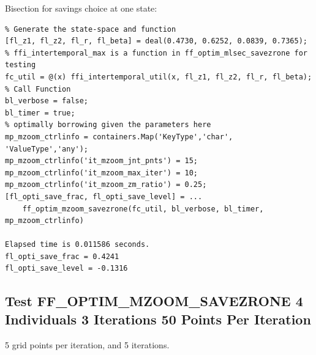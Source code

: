 \documentclass[
]{book}
\begin{document}
Bisection for savings choice at one state:

\begin{verbatim}
% Generate the state-space and function
[fl_z1, fl_z2, fl_r, fl_beta] = deal(0.4730, 0.6252, 0.0839, 0.7365);
% ffi_intertemporal_max is a function in ff_optim_mlsec_savezrone for testing
fc_util = @(x) ffi_intertemporal_util(x, fl_z1, fl_z2, fl_r, fl_beta);
% Call Function
bl_verbose = false;
bl_timer = true;
% optimally borrowing given the parameters here
mp_mzoom_ctrlinfo = containers.Map('KeyType','char', 'ValueType','any');
mp_mzoom_ctrlinfo('it_mzoom_jnt_pnts') = 15;
mp_mzoom_ctrlinfo('it_mzoom_max_iter') = 10;
mp_mzoom_ctrlinfo('it_mzoom_zm_ratio') = 0.25;
[fl_opti_save_frac, fl_opti_save_level] = ...
    ff_optim_mzoom_savezrone(fc_util, bl_verbose, bl_timer, mp_mzoom_ctrlinfo)

Elapsed time is 0.011586 seconds.
fl_opti_save_frac = 0.4241
fl_opti_save_level = -0.1316
\end{verbatim}

\hypertarget{test-ff_optim_mzoom_savezrone-4-individuals-3-iterations-50-points-per-iteration}{%
\subsection{Test FF\_OPTIM\_MZOOM\_SAVEZRONE 4 Individuals 3 Iterations 50 Points Per Iteration}\label{test-ff_optim_mzoom_savezrone-4-individuals-3-iterations-50-points-per-iteration}}

5 grid points per iteration, and 5 iterations.
\end{document}
